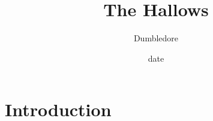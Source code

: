 \documentclass[a4paper]{article}
\title{The Hallows}
\author{Dumbledore}
\date{date}
\begin{document}
\maketitle
\section{Introduction}

% 
% 
\end{document}
